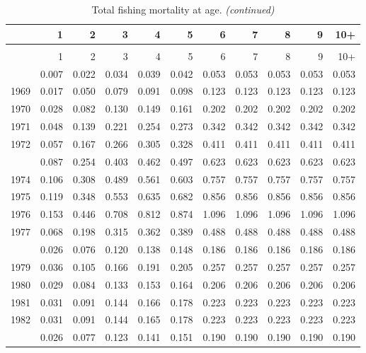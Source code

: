 \documentclass[
]{article}
\begin{document}
\begin{longtable}[t]{lrrrrrrrrrr}
\caption{\label{tab:FAA-tot-table}Total fishing mortality at age.}\\
\toprule
  & 1 & 2 & 3 & 4 & 5 & 6 & 7 & 8 & 9 & 10+\\
\midrule
\endfirsthead
\caption[]{Total fishing mortality at age. \textit{(continued)}}\\
\toprule
  & 1 & 2 & 3 & 4 & 5 & 6 & 7 & 8 & 9 & 10+\\
\midrule
\endhead

\endfoot
\bottomrule
\endlastfoot
1968 & 0.007 & 0.022 & 0.034 & 0.039 & 0.042 & 0.053 & 0.053 & 0.053 & 0.053 & 0.053\\
1969 & 0.017 & 0.050 & 0.079 & 0.091 & 0.098 & 0.123 & 0.123 & 0.123 & 0.123 & 0.123\\
1970 & 0.028 & 0.082 & 0.130 & 0.149 & 0.161 & 0.202 & 0.202 & 0.202 & 0.202 & 0.202\\
1971 & 0.048 & 0.139 & 0.221 & 0.254 & 0.273 & 0.342 & 0.342 & 0.342 & 0.342 & 0.342\\
1972 & 0.057 & 0.167 & 0.266 & 0.305 & 0.328 & 0.411 & 0.411 & 0.411 & 0.411 & 0.411\\
\addlinespace
1973 & 0.087 & 0.254 & 0.403 & 0.462 & 0.497 & 0.623 & 0.623 & 0.623 & 0.623 & 0.623\\
1974 & 0.106 & 0.308 & 0.489 & 0.561 & 0.603 & 0.757 & 0.757 & 0.757 & 0.757 & 0.757\\
1975 & 0.119 & 0.348 & 0.553 & 0.635 & 0.682 & 0.856 & 0.856 & 0.856 & 0.856 & 0.856\\
1976 & 0.153 & 0.446 & 0.708 & 0.812 & 0.874 & 1.096 & 1.096 & 1.096 & 1.096 & 1.096\\
1977 & 0.068 & 0.198 & 0.315 & 0.362 & 0.389 & 0.488 & 0.488 & 0.488 & 0.488 & 0.488\\
\addlinespace
1978 & 0.026 & 0.076 & 0.120 & 0.138 & 0.148 & 0.186 & 0.186 & 0.186 & 0.186 & 0.186\\
1979 & 0.036 & 0.105 & 0.166 & 0.191 & 0.205 & 0.257 & 0.257 & 0.257 & 0.257 & 0.257\\
1980 & 0.029 & 0.084 & 0.133 & 0.153 & 0.164 & 0.206 & 0.206 & 0.206 & 0.206 & 0.206\\
1981 & 0.031 & 0.091 & 0.144 & 0.166 & 0.178 & 0.223 & 0.223 & 0.223 & 0.223 & 0.223\\
1982 & 0.031 & 0.091 & 0.144 & 0.165 & 0.178 & 0.223 & 0.223 & 0.223 & 0.223 & 0.223\\
\addlinespace
1983 & 0.026 & 0.077 & 0.123 & 0.141 & 0.151 & 0.190 & 0.190 & 0.190 & 0.190 & 0.190\\

\end{longtable}
\end{document}
